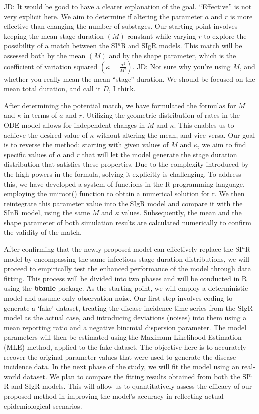 \documentclass[12pt]{article}
\begin{document}
JD: It would be good to have a clearer explanation of the goal. “Effective” is not very explicit here.
We aim to determine if altering the parameter $a$ and $r$ is more effective than changing the number of substages. Our starting point involves keeping the mean stage duration $(M)$ constant while varying $r$ to explore the possibility of a match between the SI$^n$R and SIgR models. This match will be assessed both by the mean $(M)$ and by the shape parameter, which is the coefficient of variation squared $(\kappa = \frac{\sigma^2}{M^2})$.
JD: Not sure why you're using $M$, and whether you really mean the mean “stage” duration. We should be focused on the mean total duration, and call it $D$, I think.

After determining the potential match, we have formulated the formulas for $M$ and $\kappa$ in terms of $a$ and $r$. Utilizing the geometric distribution of rates in the ODE model allows for independent changes in $M$ and $\kappa$. This enables us to achieve the desired value of $\kappa$ without altering the mean, and vice versa. Our goal is to reverse the method: starting with given values of $M$ and $\kappa$, we aim to find specific values of $a$ and $r$ that will let the model generate the stage duration distribution that satisfies these properties. Due to the complexity introduced by the high powers in the formula, solving it explicitly is challenging. To address this, we have developed a system of functions in the R programming language, employing the uniroot() function to obtain a numerical solution for r. We then reintegrate this parameter value into the SIgR model and compare it with the SInR model, using the same $M$ and $\kappa$ values. Subsequently, the mean and the shape parameter of both simulation results are calculated numerically to confirm the validity of the match.

After confirming that the newly proposed model can effectively replace the SI$^n$R model by encompassing the same infectious stage duration distributions, we will proceed to empirically test the enhanced performance of the model through data fitting. This process will be divided into two phases and will be conducted in R using the \textbf{bbmle} package. As the starting point, we will employ a deterministic model and assume only observation noise. Our first step involves coding to generate a `fake' dataset, treating the disease incidence time series from the SIgR model as the actual case, and introducing deviations (noises) into them using a mean reporting ratio and a negative binomial dispersion parameter. The model parameters will then be estimated using the Maximum Likelihood Estimation (MLE) method, applied to the fake dataset. The objective here is to accurately recover the original parameter values that were used to generate the disease incidence data. In the next phase of the study, we will fit the model using an real-world dataset. We plan to compare the fitting results obtained from both the SI$^n$R and SIgR models. This will allow us to quantitatively assess the efficacy of our proposed method in improving the model's accuracy in reflecting actual epidemiological scenarios.
\end{document}
